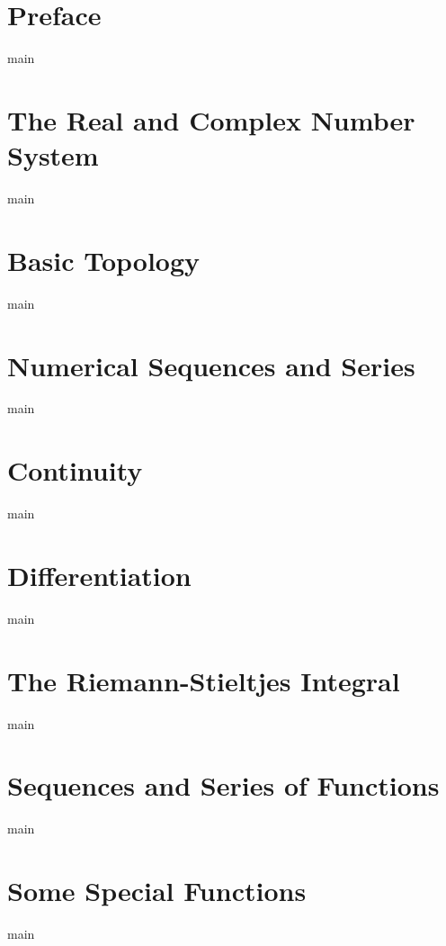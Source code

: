 
\chapter*{Preface}\label{chap:00-preface}
{main}

\chapter{The Real and Complex Number System}\label{chap:01-the-real-and-complex-number-system}
{main}

\chapter{Basic Topology}\label{chap:02-basic-topology}
{main}

\chapter{Numerical Sequences and Series}\label{chap:03-numerical-sequences-and-series}
{main}

\chapter{Continuity}\label{chap:04-continuity}
{main}

\chapter{Differentiation}\label{chap:05-differentiation}
{main}

\chapter{The Riemann-Stieltjes Integral}\label{chap:06-the-riemann-stieltjes-integral}
{main}

\chapter{Sequences and Series of Functions}\label{chap:07-sequences-and-series-of-functions}
{main}

\chapter{Some Special Functions}\label{chap:08-some-special-functions}
{main}

